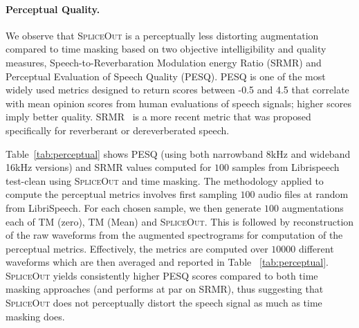 \documentclass{article}
\newcommand{\SpA}{{\textsc{SpliceOut}}\xspace}
\begin{document}


\iffalse
\paragraph*{Perceptual Quality.} We observe that \SpA is a perceptually less distorting augmentation compared to time masking based on two objective intelligibility and quality measures, Speech-to-Reverbaration Modulation energy Ratio (SRMR) and Perceptual Evaluation of Speech Quality (PESQ). PESQ is one of the most widely used metrics designed to return scores between -0.5 and 4.5 that correlate with mean opinion scores from human evaluations of speech signals; higher scores imply better quality. SRMR~\citep{falk2010non} is a more recent metric that was proposed specifically for reverberant or dereverberated speech.

Table~\ref{tab:perceptual} shows PESQ (using both narrowband 8kHz and wideband 16kHz versions) and SRMR values computed for $100$ samples from Librispeech test-clean using \SpA and time masking.
The methodology applied to compute the perceptual metrics involves first sampling $100$ audio files at random from LibriSpeech. For each chosen sample, we then generate $100$ augmentations each of TM (zero), TM (Mean) and \SpA. This is followed by reconstruction of the raw waveforms from the augmented spectrograms for computation of the perceptual metrics. Effectively, the metrics are computed over $10000$ different waveforms which are then averaged and reported in Table ~\ref{tab:perceptual}.
\SpA yields consistently higher PESQ scores compared to both time masking approaches (and performs at par on SRMR), thus suggesting that \SpA does not perceptually distort the speech signal as much as time masking does.

\end{document}
